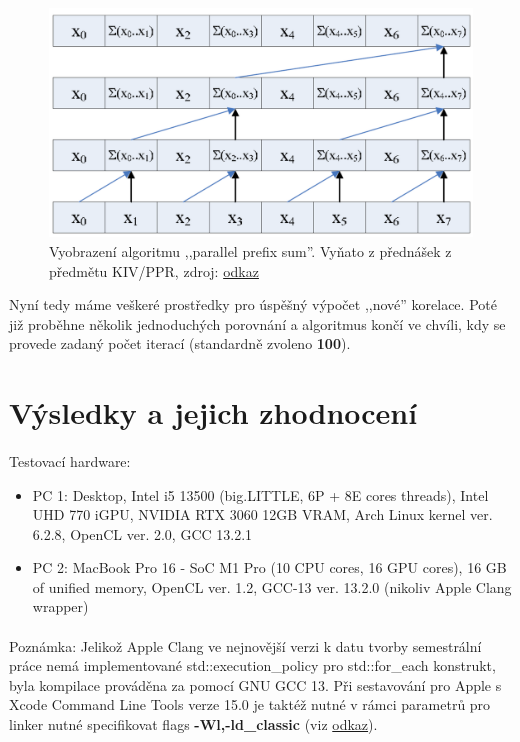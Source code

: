 \documentclass[12pt, a4paper]{article}
\begin{document}
\begin{figure}
 \centering
  \includegraphics[width=\linewidth]{assets/parallel-prefix-sum.png}
  \caption{Vyobrazení algoritmu ,,parallel prefix sum''. Vyňato z přednášek z předmětu KIV/PPR, zdroj: \href{http://beowulf.lcs.mit.edu/18.337/lectslides/scan.pdf}{odkaz}}
\end{figure}

Nyní tedy máme veškeré prostředky pro úspěšný výpočet ,,nové'' korelace. 
Poté již proběhne několik jednoduchých porovnání a algoritmus končí ve chvíli, kdy se provede zadaný počet iterací (standardně zvoleno \textbf{100}).

\newpage
\section{Výsledky a jejich zhodnocení}
\label{chapter-results}
\paragraph{} Testovací hardware:
\begin{itemize}
  \item PC 1: Desktop, Intel i5 13500 (big.LITTLE, 6P + 8E cores  threads), Intel UHD 770 iGPU, NVIDIA RTX 3060 12GB VRAM, Arch Linux kernel ver. 6.2.8, OpenCL ver. 2.0, GCC 13.2.1
  \item PC 2: MacBook Pro 16 - SoC M1 Pro (10 CPU cores, 16 GPU cores), 16 GB of unified memory, OpenCL ver. 1.2, GCC-13 ver. 13.2.0 (nikoliv Apple Clang wrapper)
\end{itemize}

\paragraph{} Poznámka: Jelikož Apple Clang ve nejnovější verzi k datu tvorby semestrální práce nemá implementované std::execution\_policy pro std::for\_each konstrukt, byla kompilace prováděna za pomocí GNU GCC 13.
Při sestavování pro Apple s Xcode Command Line Tools verze 15.0 je taktéž nutné v rámci parametrů pro linker nutné specifikovat flags \textbf{-Wl,-ld\_classic} (viz \href{https://github.com/Homebrew/homebrew-core/issues/145991}{odkaz}).
\end{document}
